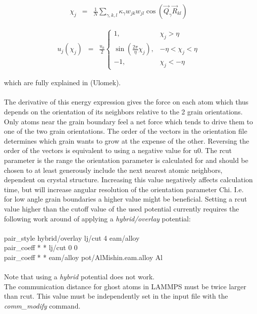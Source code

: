 \documentclass[11pt]{article}
\begin{document}
\begin{eqnarray}
\chi_{j} & = & \frac{1}{N}\sum_{\gamma,k,l}{\kappa_{\gamma}w_{jk}w_{jl}\cos(\vec{Q}_{\gamma}\vec{R}_{kl})}
\label{eq:force-long}
\end{eqnarray}

\begin{eqnarray}
u_{j}(\chi_{j}) & = & \frac{u_{0}}{2}\left\{\begin{array}{lc}
1, & \chi_{j}>\eta\\
\sin\left(\frac{2\pi}{\eta}\chi_{j}\right), &  -\eta<\chi_{j}<\eta\\
-1, & \chi_{j}<-\eta
\end{array}\right.
\label{eq:energy-mid}
\end{eqnarray}

which are fully explained in (Ulomek).\\
\\
The derivative of this energy expression gives the force on each atom which thus depends on the orientation of its neighbors relative to the 2 grain orientations. Only atoms near the grain boundary feel a net force which tends to drive them to one of the two grain orientations.
The order of the vectors in the orientation file determines which grain wants to grow at the expense of the other. Reversing the order of the vectors is equivalent to using a negative value for u0.
The rcut parameter is the range the orientation parameter is calculated for and should be chosen to at least generously include the next nearest atomic neighbors, dependent on crystal structure. Increasing this value negatively affects calculation time, but will increase angular resolution of the orientation parameter Chi. I.e. for low angle grain boundaries a higher value might be beneficial. 
Setting a rcut value higher than the cutoff value of the used potential currently requires the following work around of applying a \emph{hybrid/overlay} potential:\\
\\
pair\_style hybrid/overlay lj/cut 4 eam/alloy\\
pair\_coeff * * lj/cut 0 0\\
pair\_coeff * * eam/alloy pot/AlMishin.eam.alloy Al\\
\\
Note that using a \emph{hybrid} potential does not work.\\
The communication distance for ghost atoms in LAMMPS must be twice larger than rcut. This value must be independently set in the input file with the \emph{comm\_modify} command.
\end{document}
